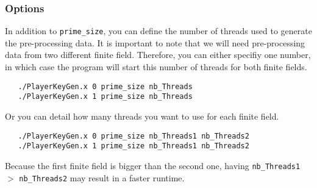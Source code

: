 \subsubsection{Options}
In addition to \verb+prime_size+, you can define
the number of threads used to generate the 
pre-processing data.
It is important to note that we will need pre-processing
data from two different finite field.
Therefore, you can either specifiy one number, in which 
case the program will start this number of threads for 
both finite fields.
\begin{verbatim}
   ./PlayerKeyGen.x 0 prime_size nb_Threads
   ./PlayerKeyGen.x 1 prime_size nb_Threads
\end{verbatim}
Or you can detail how many threads you want to use for
each finite field.
\begin{verbatim}
   ./PlayerKeyGen.x 0 prime_size nb_Threads1 nb_Threads2
   ./PlayerKeyGen.x 1 prime_size nb_Threads1 nb_Threads2
\end{verbatim}
Because the first finite field is bigger than the second one,
having \verb+nb_Threads1+ $>$ \verb+nb_Threads2+ may result
in a faster runtime.

